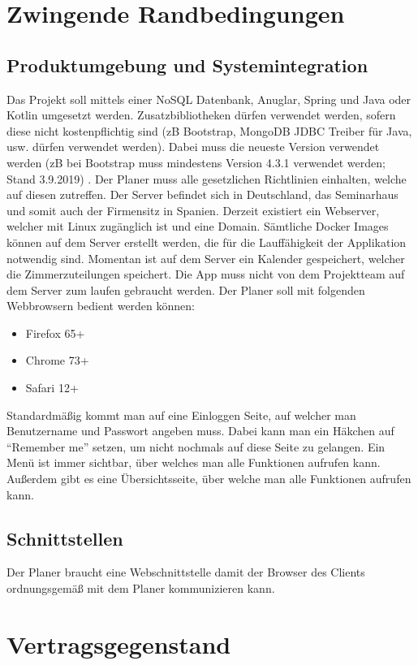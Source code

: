 \section{Zwingende Randbedingungen}
    \subsection{Produktumgebung und Systemintegration}
        Das Projekt soll mittels einer NoSQL Datenbank, Anuglar, Spring und Java oder Kotlin umgesetzt werden. Zusatzbibliotheken dürfen verwendet werden, sofern diese nicht kostenpflichtig sind (zB Bootstrap,  MongoDB JDBC Treiber für Java, usw. dürfen verwendet werden). Dabei muss die neueste Version verwendet werden (zB bei Bootstrap muss mindestens Version 4.3.1 verwendet werden; Stand 3.9.2019) . Der Planer muss alle gesetzlichen Richtlinien einhalten, welche auf diesen zutreffen. Der Server befindet sich in Deutschland, das Seminarhaus und somit auch der Firmensitz in Spanien. Derzeit existiert ein Webserver, welcher mit Linux zugänglich ist und eine Domain. Sämtliche Docker Images können auf dem Server erstellt werden, die für die Lauffähigkeit der Applikation notwendig sind. Momentan ist auf dem Server ein Kalender gespeichert, welcher die Zimmerzuteilungen speichert. Die App muss nicht von dem Projektteam auf dem Server zum laufen gebraucht werden. Der Planer soll mit folgenden Webbrowsern bedient werden können:
        \begin{itemize}
            \item Firefox 65+
            \item Chrome 73+
            \item Safari 12+
        \end{itemize}
        Standardmäßig kommt man auf eine Einloggen Seite, auf welcher man Benutzername und Passwort angeben muss. Dabei kann man ein Häkchen auf ``Remember me'' setzen, um nicht nochmals auf diese Seite zu gelangen. Ein Menü ist immer sichtbar, über welches man alle Funktionen aufrufen kann. Außerdem gibt es eine Übersichtsseite, über welche man alle Funktionen aufrufen kann.
    \subsection{Schnittstellen}
        Der Planer braucht eine Webschnittstelle damit der Browser des Clients ordnungsgemäß mit dem Planer kommunizieren kann.



\section{Vertragsgegenstand}
